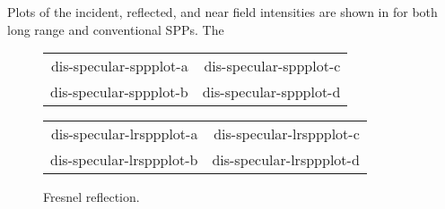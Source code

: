 Plots of the incident, reflected, and near field intensities are shown in
 for both long range and conventional SPPs.
The 


\begin{figure}[ht]
 \centering
 \pgfplotsset{
 minor tick num=3,
 footnotesize,
 trim axis right,
 max space between ticks=30pt,
}
\tikzset{baseline}
\begin{tabular}{rr}
{dis-specular-sppplot-a}&{dis-specular-sppplot-c}\\
{dis-specular-sppplot-b}&{dis-specular-sppplot-d}
\end{tabular}
\begin{tabular}{rr}
{dis-specular-lrsppplot-a}&{dis-specular-lrsppplot-c}\\
{dis-specular-lrsppplot-b}&{dis-specular-lrsppplot-d}
\end{tabular}
\label{fig:fresnellrsppfig}
\caption{Fresnel reflection.}
\end{figure}

